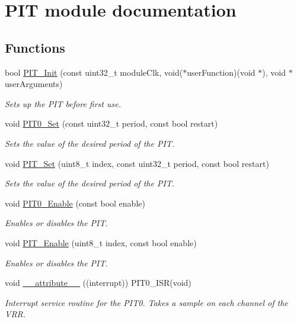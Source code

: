 \hypertarget{group___p_i_t__module}{}\section{P\+I\+T module documentation}
\label{group___p_i_t__module}
\subsection*{Functions}
\begin{DoxyCompactItemize}
\item 
bool \hyperlink{group___p_i_t__module_gae69097a83912a25b357df1046aea9b52}{P\+I\+T\+\_\+\+Init} (const uint32\+\_\+t module\+Clk, void($\ast$user\+Function)(void $\ast$), void $\ast$user\+Arguments)
\begin{DoxyCompactList}\small\item\em Sets up the P\+I\+T before first use. \end{DoxyCompactList}\item 
void \hyperlink{group___p_i_t__module_ga665cdbb8fcf7421d67707b7eb9b07613}{P\+I\+T0\+\_\+\+Set} (const uint32\+\_\+t period, const bool restart)
\begin{DoxyCompactList}\small\item\em Sets the value of the desired period of the P\+I\+T. \end{DoxyCompactList}\item 
void \hyperlink{group___p_i_t__module_ga556ce13d8cd621be74e66ddb738f9f14}{P\+I\+T\+\_\+\+Set} (uint8\+\_\+t index, const uint32\+\_\+t period, const bool restart)
\begin{DoxyCompactList}\small\item\em Sets the value of the desired period of the P\+I\+T. \end{DoxyCompactList}\item 
void \hyperlink{group___p_i_t__module_ga58a66eb7931c1d1ff075b7d5f63c5a90}{P\+I\+T0\+\_\+\+Enable} (const bool enable)
\begin{DoxyCompactList}\small\item\em Enables or disables the P\+I\+T. \end{DoxyCompactList}\item 
void \hyperlink{group___p_i_t__module_ga71229c1a14b8d91a133ace8ff3acf3ba}{P\+I\+T\+\_\+\+Enable} (uint8\+\_\+t index, const bool enable)
\begin{DoxyCompactList}\small\item\em Enables or disables the P\+I\+T. \end{DoxyCompactList}\item 
void \hyperlink{group___p_i_t__module_ga04dff669ed70d772aff393a56e90b824}{\+\_\+\+\_\+attribute\+\_\+\+\_\+} ((interrupt)) P\+I\+T0\+\_\+\+I\+S\+R(void)
\begin{DoxyCompactList}\small\item\em Interrupt service routine for the P\+I\+T0. Takes a sample on each channel of the V\+R\+R. \end{DoxyCompactList}\end{DoxyCompactItemize}
